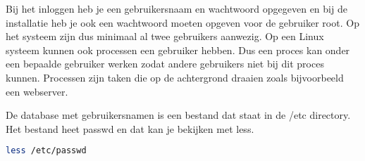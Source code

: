 Bij het inloggen heb je een gebruikersnaam en wachtwoord opgegeven en bij de installatie heb je ook een wachtwoord moeten opgeven voor de gebruiker root. Op het systeem zijn dus minimaal al twee gebruikers aanwezig. Op een Linux systeem kunnen ook processen een gebruiker hebben. Dus een proces kan onder een bepaalde gebruiker werken zodat andere gebruikers niet bij dit proces kunnen. Processen zijn taken die op de achtergrond draaien zoals bijvoorbeeld een webserver.

De database met gebruikersnamen is een bestand dat staat in de /etc directory. Het bestand heet passwd en dat kan je bekijken met less.

\begin{lstlisting}[language=bash]
less /etc/passwd
\end{lstlisting}
